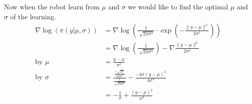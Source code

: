 \documentclass{article}
\begin{document}
    \subsection{}
    Now when the robot learn from $\mu$ and $\sigma$ we would like to find the optimal $\mu$ and $\sigma$ of the learning.
    \begin{equation}
        \begin{split}
            \nabla \log(\pi(y|\mu,\sigma)) &= \nabla \log(\frac{1}{\sqrt[]{2\pi\sigma^2}}\cdot \exp(-\frac{\|y-\mu\|^2}{2\sigma^2})) \\
            &= \nabla \log(\frac{1}{\sqrt[]{2\pi\sigma^2}}) -\nabla \frac{\|y-\mu\|^2}{2\sigma^2}\\
            \text{by }\mu &= \frac{y-\mu}{\sigma^2}\\
            \text{by }\sigma &= \frac{\frac{-\sqrt{2\pi}}{2\pi\sigma^2}}{\frac{1}{\sqrt[]{2\pi \sigma^2}}} - \frac{-4\sigma(y-\mu)^2}{4\sigma^4}\\
            &= -\frac{1}{\sigma}+\frac{(y-\mu)^2}{\sigma^3}\\
        \end{split}
    \end{equation}
\end{document}
